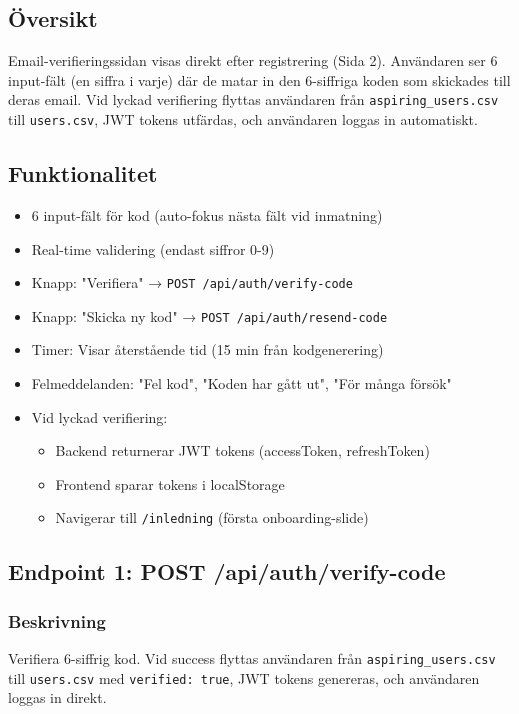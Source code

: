 \documentclass[12pt,a4paper]{article}
\begin{document}
\subsection{Översikt}
Email-verifieringssidan visas direkt efter registrering (Sida 2). Användaren ser 6 input-fält (en siffra i varje) där de matar in den 6-siffriga koden som skickades till deras email. Vid lyckad verifiering flyttas användaren från \texttt{aspiring\_users.csv} till \texttt{users.csv}, JWT tokens utfärdas, och användaren loggas in automatiskt.

\subsection{Funktionalitet}
\begin{itemize}[noitemsep]
  \item 6 input-fält för kod (auto-fokus nästa fält vid inmatning)
  \item Real-time validering (endast siffror 0-9)
  \item Knapp: "Verifiera" → \texttt{POST /api/auth/verify-code}
  \item Knapp: "Skicka ny kod" → \texttt{POST /api/auth/resend-code}
  \item Timer: Visar återstående tid (15 min från kodgenerering)
  \item Felmeddelanden: "Fel kod", "Koden har gått ut", "För många försök"
  \item Vid lyckad verifiering:
  \begin{itemize}[noitemsep]
    \item Backend returnerar JWT tokens (accessToken, refreshToken)
    \item Frontend sparar tokens i localStorage
    \item Navigerar till \texttt{/inledning} (första onboarding-slide)
  \end{itemize}
\end{itemize}

\subsection{Endpoint 1: POST /api/auth/verify-code}

\subsubsection{Beskrivning}
Verifiera 6-siffrig kod. Vid success flyttas användaren från \texttt{aspiring\_users.csv} till \texttt{users.csv} med \texttt{verified: true}, JWT tokens genereras, och användaren loggas in direkt.
\end{document}
